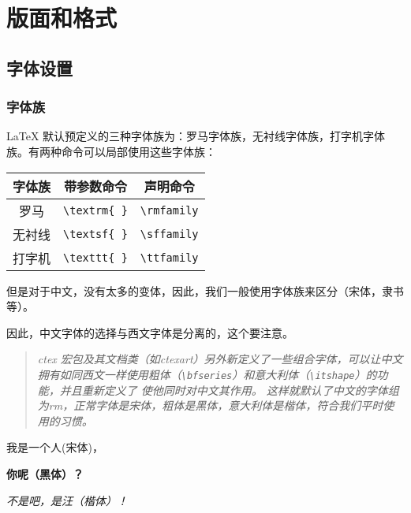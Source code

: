 \chapter{版面和格式}\label{chap:format}



\section{字体设置}\label{sec:font}

\subsection{字体族}
LaTeX 默认预定义的三种字体族为：罗马字体族，无衬线字体族，打字机字体族。有两种命令可以局部使用这些字体族：
\begin{table}[!h]
  \centering
  \begin{tabular}{ccc}
    \toprule
    字体族 & 带参数命令                  & 声明命令                  \\
    \midrule
    罗马  & \lstinline|\textrm{ }| & \lstinline|\rmfamily| \\
    无衬线 & \lstinline|\textsf{ }| & \lstinline|\sffamily| \\
    打字机 & \lstinline|\texttt{ }| & \lstinline|\ttfamily| \\
    \bottomrule
  \end{tabular}
\end{table}

但是对于中文，没有太多的变体，因此，我们一般使用字体族来区分（宋体，隶书等）。

\begin{explain*}{}
  因此，中文字体的选择与西文字体是分离的，这个要注意。
\end{explain*}
\begin{quote}
  \itshape
  ctex 宏包及其文档类（如ctexart）另外新定义了一些组合字体，可以让中文拥有如同西文一样使用粗体（\lstinline|\bfseries|）和意大利体（\lstinline|\itshape|）的功能，并且重新定义了 \rmfamily 使他同时对中文其作用。 这样就默认了中文的字体组为rm，正常字体是宋体，粗体是黑体，意大利体是楷体，符合我们平时使用的习惯。
\end{quote}
\begin{codeshow}
  我是一个人(宋体)，

  \textbf{你呢（黑体）？}

  \textit{不是吧，是汪（楷体）！}
\end{codeshow}

